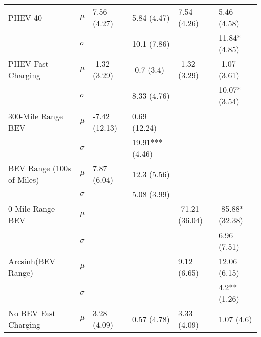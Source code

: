 \begin{tabular}{llllll}
                  PHEV 40 &     $\mu$ &                   7.56 (4.27) &                   5.84 (4.47) &                    7.54 (4.26) &                    5.46 (4.58) \\
                          &  $\sigma$ &                               &                   10.1 (7.86) &                                &                  11.84* (4.85) \\
       PHEV Fast Charging &     $\mu$ &                  -1.32 (3.29) &                    -0.7 (3.4) &                   -1.32 (3.29) &                   -1.07 (3.61) \\
                          &  $\sigma$ &                               &                   8.33 (4.76) &                                &                  10.07* (3.54) \\
       300-Mile Range BEV &     $\mu$ &                 -7.42 (12.13) &                  0.69 (12.24) &                                &                                \\
                          &  $\sigma$ &                               &               19.91*** (4.46) &                                &                                \\
BEV Range (100s of Miles) &     $\mu$ &                   7.87 (6.04) &                   12.3 (5.56) &                                &                                \\
                          &  $\sigma$ &                               &                   5.08 (3.99) &                                &                                \\
         0-Mile Range BEV &     $\mu$ &                               &                               &                 -71.21 (36.04) &                -85.88* (32.38) \\
                          &  $\sigma$ &                               &                               &                                &                    6.96 (7.51) \\
       Arcsinh(BEV Range) &     $\mu$ &                               &                               &                    9.12 (6.65) &                   12.06 (6.15) \\
                          &  $\sigma$ &                               &                               &                                &                   4.2** (1.26) \\
     No BEV Fast Charging &     $\mu$ &                   3.28 (4.09) &                   0.57 (4.78) &                    3.33 (4.09) &                     1.07 (4.6) \\

\end{tabular}
